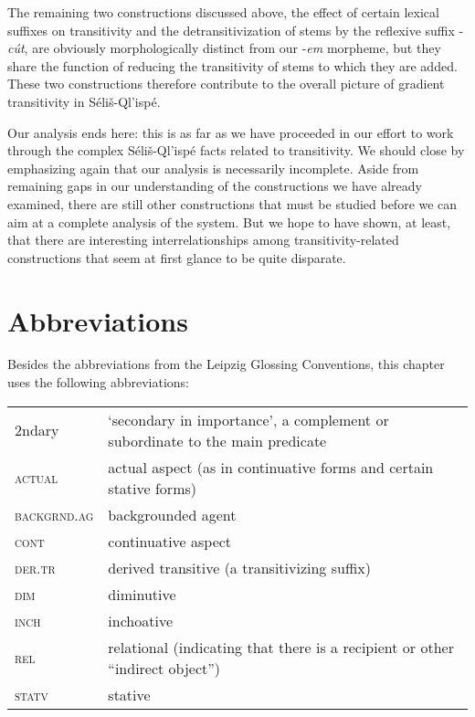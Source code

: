 \documentclass[output=paper,colorlinks,citecolor=brown]{langscibook}
\begin{document}
The remaining two constructions discussed above, the effect of certain
lexical suffixes on transitivity and the detransitivization of stems
by the reflexive suffix -\emph{c\'ut}, are obviously morphologically
distinct from our -\emph{em} morpheme, but they share the function of
reducing the transitivity of stems to which they are added.  These two
constructions therefore contribute to the overall picture of gradient
transitivity in S\'eli\v{s}-Ql'isp\'e.

Our analysis ends here: this is as far as we have proceeded in our
effort to work through the complex S\'eli\v{s}-Ql'isp\'e facts related
to transitivity.  We should close by emphasizing again that our
analysis is necessarily incomplete.  Aside from remaining gaps in our
understanding of the constructions we have already examined, there are
still other constructions that must be studied before we can aim at a
complete analysis of the system.  But we hope to have shown, at least,
that there are interesting interrelationships among
transitivity-related constructions that seem at first glance to be
quite disparate.

\section*{Abbreviations}

Besides the abbreviations from the Leipzig Glossing Conventions, this chapter uses the following
abbreviations:\medskip\\

\noindent\begin{tabularx}{\textwidth}{@{}lQ@{}}
2ndary & `secondary in importance', a complement or subordinate to
  the main predicate \\
\textsc{actual} & actual aspect (as in continuative forms and certain stative forms) \\
\textsc{backgrnd.ag} & backgrounded agent \\
\textsc{cont} & continuative aspect \\
\textsc{der.tr} & derived transitive (a transitivizing suffix) \\
\textsc{dim} & diminutive \\
\textsc{inch} & inchoative \\
\textsc{rel} & relational (indicating that there is a recipient or other ``indirect object'') \\
\textsc{statv} & stative \\
\end{tabularx}
\end{document}
